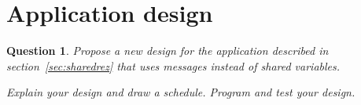 \documentclass[11pt]{report}
\newtheorem{ex}{Question}
\begin{document}
\section{Application design}

\begin{ex}
  Propose a new design for the application described in section~\ref{sec:sharedrez} that uses messages instead of shared variables.

  Explain your design and draw a schedule. Program and test your design.
\end{ex}
\end{document}
